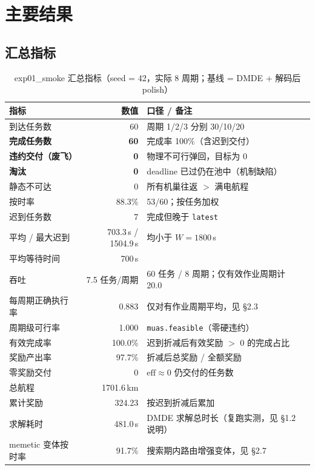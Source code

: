 \documentclass[a4paper,11pt]{article}
\begin{document}
\section{主要结果}

\subsection{汇总指标}

\begin{table}[H]
\centering
\caption{exp01\_smoke 汇总指标（seed = 42，实际 8 周期；基线 = DMDE + 解码后 polish）}
\label{tab:summary}
\small
\begin{tabular}{lrll}
\toprule
指标 & 数值 & 口径 / 备注 \\
\midrule
到达任务数            & 60        & 周期 1/2/3 分别 30/10/20 \\
\textbf{完成任务数}   & \textbf{60} & 完成率 100\%（含迟到交付） \\
\textbf{违约交付（废飞）} & \textbf{0} & 物理不可行弹回，目标为 0 \\
\textbf{淘汰}     & \textbf{0} & deadline 已过仍在池中（机制缺陷） \\
静态不可达            & 0         & 所有机巢往返 $>$ 满电航程 \\
按时率                & 88.3\%    & 53/60；按任务加权 \\
迟到任务数            & 7         & 完成但晚于 \texttt{latest} \\
平均 / 最大迟到       & 703.3\,s / 1504.9\,s & 均小于 $W=1800$\,s \\
平均等待时间          & 700\,s    & \\
吞吐                  & 7.5 任务/周期 & 60 任务 / 8 周期；仅有效作业周期计 20.0 \\
每周期正确执行率      & 0.883     & 仅对有作业周期平均，见 \S 2.3 \\
周期级可行率          & 1.000     & \texttt{muas.feasible}（零硬违约） \\
有效完成率            & 100.0\%   & 迟到折减后有效奖励 $>$ 0 的完成占比 \\
奖励产出率            & 97.7\%    & 折减后总奖励 / 全额奖励 \\
零奖励交付            & 0         & $\text{eff}\approx 0$ 仍交付的任务数 \\
总航程                & 1701.6\,km & \\
累计奖励              & 324.23    & 按迟到折减后累加 \\
求解耗时              & 481.0\,s  & DMDE 求解总时长（复跑实测，见 \S 1.2 说明） \\
memetic 变体按时率    & 91.7\%    & 搜索期内路由增强变体，见 \S 2.7 \\
\bottomrule
\end{tabular}
\end{table}
\end{document}
